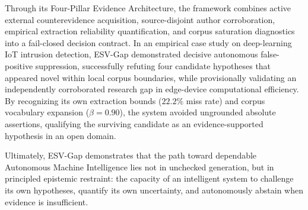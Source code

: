 \documentclass[conference,10pt]{IEEEtran}
\newcommand{\method}{ESV-Gap}
\begin{document}
Through its Four-Pillar Evidence Architecture, the framework combines active external counterevidence acquisition, source-disjoint author corroboration, empirical extraction reliability quantification, and corpus saturation diagnostics into a fail-closed decision contract. In an empirical case study on deep-learning IoT intrusion detection, \method{} demonstrated decisive autonomous false-positive suppression, successfully refuting four candidate hypotheses that appeared novel within local corpus boundaries, while provisionally validating an independently corroborated research gap in edge-device computational efficiency. By recognizing its own extraction bounds ($22.2\%$ miss rate) and corpus vocabulary expansion ($\beta = 0.90$), the system avoided ungrounded absolute assertions, qualifying the surviving candidate as an evidence-supported hypothesis in an open domain.

Ultimately, \method{} demonstrates that the path toward dependable Autonomous Machine Intelligence lies not in unchecked generation, but in principled epistemic restraint: the capacity of an intelligent system to challenge its own hypotheses, quantify its own uncertainty, and autonomously abstain when evidence is insufficient.
\end{document}
